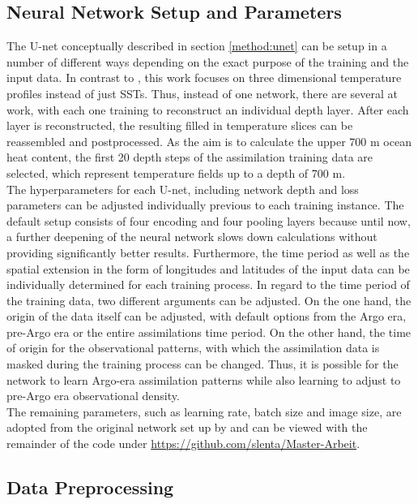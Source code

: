 \documentclass[Masterarbeit.tex]{subfile}
\begin{document}
	\subsection{Neural Network Setup and Parameters}
	
	The U-net conceptually described in section \ref{method:unet} can be setup in a number of different ways depending on the exact purpose of the training and the input data. In contrast to \cite{kadow_artificial_2020}, this work focuses on three dimensional temperature profiles instead of just SSTs. Thus, instead of one network, there are several at work, with each one training to reconstruct an individual depth layer. After each layer is reconstructed, the resulting filled in temperature slices can be reassembled and postprocessed. As the aim is to calculate the upper 700 m ocean heat content, the first 20 depth steps of the assimilation training data are selected, which represent temperature fields up to a depth of 700 m. \\
	The hyperparameters for each U-net, including network depth and loss parameters can be adjusted individually previous to each training instance. The default setup consists of four encoding and four pooling layers because until now, a further deepening of the neural network slows down calculations without providing significantly better results. Furthermore, the time period as well as the spatial extension in the form of longitudes and latitudes of the input data can be individually determined for each training process. In regard to the time period of the training data, two different arguments can be adjusted. On the one hand, the origin of the data itself can be adjusted, with default options from the Argo era, pre-Argo era or the entire assimilations time period. On the other hand, the time of origin for the observational patterns, with which the assimilation data is masked during the training process can be changed. Thus, it is possible for the network to learn Argo-era assimilation patterns while also learning to adjust to pre-Argo era observational density. \\
	The remaining parameters, such as learning rate, batch size and image size, are adopted from the original network set up by \cite{kadow_artificial_2020} and can be viewed with the remainder of the code under \url{https://github.com/slenta/Master-Arbeit}.
	
	\subsection{Data Preprocessing}
	
\end{document}
